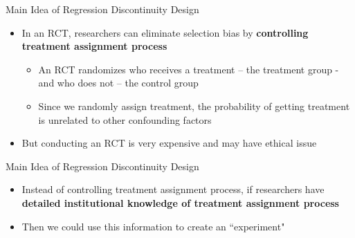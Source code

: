 \documentclass[hyperref={pdfpagelabels=false}]{beamer}
\begin{document}
	\begin{frame}{Main Idea of Regression Discontinuity Design}{}
		\begin{itemize}
			
			\item In an RCT, researchers can eliminate selection bias by \textbf{controlling treatment assignment process}
			\vspace{0.2cm}
					\begin{itemize}
			
			\item An RCT randomizes who receives a treatment – the treatment group - and who does not – the control group
			\vspace{0.2cm}

			\item Since we randomly assign treatment, the probability of getting treatment is unrelated to other confounding factors 
								\end{itemize}	
			\vspace{0.2cm}	
			\item But conducting an RCT is very expensive and may have ethical issue
			
			
			
		\end{itemize}
	\end{frame}
	
	
	
	
	
	\begin{frame}{Main Idea of Regression Discontinuity Design}{}
		\begin{itemize}
			\item Instead of controlling treatment assignment process, if researchers have \textbf{detailed institutional knowledge of treatment assignment process}
			\vspace{0.2cm}
			\item Then we could use this information to create an ``experiment"
			
			
			
		\end{itemize}
	\end{frame}
	
	
	
	
	
\end{document}
